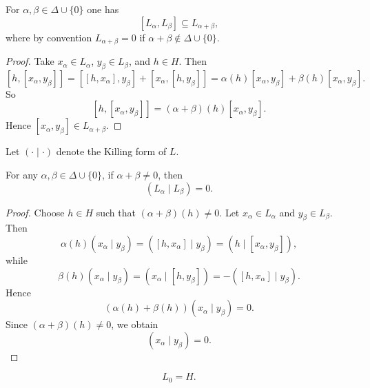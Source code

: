 \begin{lemma}
    For $\alpha,\beta\in \Delta\cup\{0\}$ one has
    \[
        [L_\alpha,L_\beta]\subseteq L_{\alpha+\beta},
    \]
    where by convention $L_{\alpha+\beta}=0$ if $\alpha+\beta\notin \Delta\cup\{0\}$.
\end{lemma}

\begin{proof}
    Take $x_\alpha\in L_\alpha$, $y_\beta\in L_\beta$, and $h\in H$. Then
    \[
        [h,[x_\alpha,y_\beta]]
        =
        [[h,x_\alpha],y_\beta]+[x_\alpha,[h,y_\beta]]
        =
        \alpha(h)[x_\alpha,y_\beta]+\beta(h)[x_\alpha,y_\beta].
    \]
    So
    \[
        [h,[x_\alpha,y_\beta]]
        =
        (\alpha+\beta)(h)[x_\alpha,y_\beta].
    \]
    Hence $[x_\alpha,y_\beta]\in L_{\alpha+\beta}$.
\end{proof}

Let $(\cdot\mid\cdot)$ denote the Killing form of $L$.

\begin{lemma}
    For any $\alpha,\beta\in \Delta\cup\{0\}$, if $\alpha+\beta\neq 0$, then
    \[
        (L_\alpha\mid L_\beta)=0.
    \]
\end{lemma}

\begin{proof}
    Choose $h\in H$ such that $(\alpha+\beta)(h)\neq 0$.
    Let $x_\alpha\in L_\alpha$ and $y_\beta\in L_\beta$. Then
    \[
        \alpha(h)(x_\alpha\mid y_\beta)
        =
        ([h,x_\alpha]\mid y_\beta)
        =
        (h\mid [x_\alpha,y_\beta]),
    \]
    while
    \[
        \beta(h)(x_\alpha\mid y_\beta)
        =
        (x_\alpha\mid [h,y_\beta])
        =
        -([h,x_\alpha]\mid y_\beta).
    \]
    Hence
    \[
        (\alpha(h)+\beta(h))(x_\alpha\mid y_\beta)=0.
    \]
    Since $(\alpha+\beta)(h)\neq 0$, we obtain
    \[
        (x_\alpha\mid y_\beta)=0.
    \]
\end{proof}

\begin{lemma}
    \[
        L_0=H.
    \]
\end{lemma}

